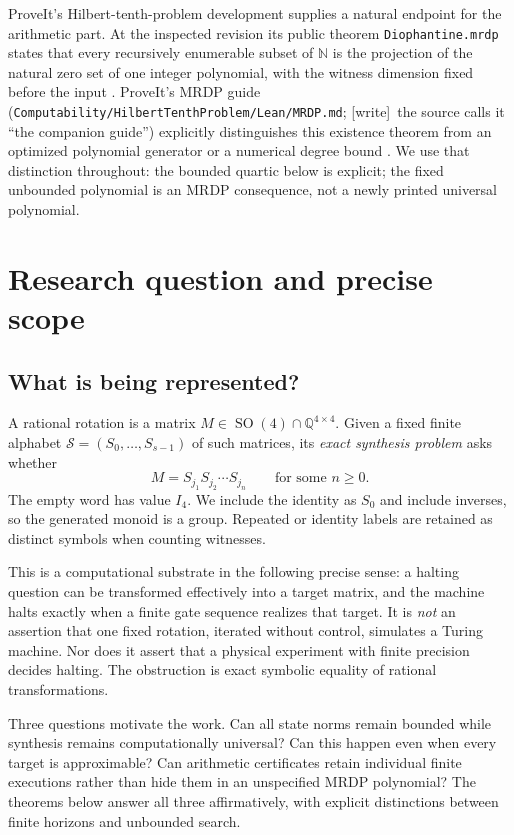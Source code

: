 \documentclass[11pt,letterpaper]{article}
\numberwithin{equation}{section}
\theoremstyle{definition}
\theoremstyle{remark}
\newcommand{\N}{\mathbb N}
\newcommand{\Q}{\mathbb Q}
\newcommand{\code}[1]{\nolinkurl{#1}}
\newcommand{\wtag}{\textup{[write]}}
\newcommand{\srcmark}[1]{\par\noindent{\small\itshape [source~#1]}\par}
\newcommand{\SO}{\operatorname{SO}}
\begin{document}
ProveIt's Hilbert-tenth-problem development supplies a natural endpoint
for the arithmetic part. At the inspected revision its public theorem
\code{Diophantine.mrdp} states that every recursively enumerable subset of
$\N$ is the projection of the natural zero set of one integer polynomial,
with the witness dimension fixed before the input \cite{b62s11-ProveItMRDP}.
ProveIt's MRDP guide (\code{Computability/HilbertTenthProblem/Lean/MRDP.md}; \wtag\ the source calls it ``the companion guide'') explicitly distinguishes this existence theorem from
an optimized polynomial generator or a numerical degree bound
\cite{b62s11-ProveItGuide}. We use that distinction throughout: the bounded
quartic below is explicit; the fixed unbounded polynomial is an MRDP
consequence, not a newly printed universal polynomial.
\section{Research question and precise scope}
\label{pqc:dr:sec:scope}
\srcmark{16}

\subsection{What is being represented?}
A rational rotation is a matrix $M\in\SO(4)\cap\Q^{4\times4}$.
Given a fixed finite alphabet $\mathcal S=(S_0,\ldots,S_{s-1})$ of such
matrices, its \emph{exact synthesis problem} asks whether
\begin{equation}
 M=S_{j_1}S_{j_2}\cdots S_{j_n}
 \qquad\text{for some }n\geq0.
 \label{pqc:dr:eq:synthesis}
\end{equation}
The empty word has value $I_4$. We include the identity as $S_0$ and include
inverses, so the generated monoid is a group. Repeated or identity labels
are retained as distinct symbols when counting witnesses.

This is a computational substrate in the following precise sense: a
halting question can be transformed effectively into a target matrix, and
the machine halts exactly when a finite gate sequence realizes that target.
It is \emph{not} an assertion that one fixed rotation, iterated without
control, simulates a Turing machine. Nor does it assert that a physical
experiment with finite precision decides halting. The obstruction is exact
symbolic equality of rational transformations.

Three questions motivate the work. Can all state norms remain bounded
while synthesis remains computationally universal? Can this happen even
when every target is approximable? Can arithmetic certificates retain
individual finite executions rather than hide them in an unspecified
MRDP polynomial? The theorems below answer all three affirmatively, with
explicit distinctions between finite horizons and unbounded search.
\end{document}
